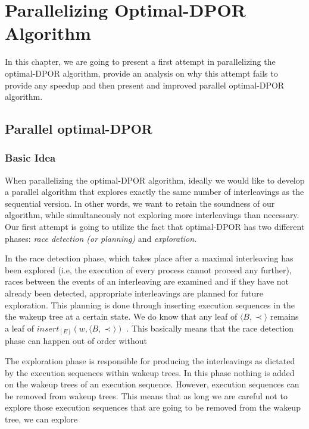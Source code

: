 \chapter{Parallelizing Optimal-DPOR Algorithm}
\label{paradpor_opt}

In this chapter, we are going to present a first attempt in parallelizing the optimal-DPOR
algorithm, provide an analysis on why this attempt fails to provide any speedup and then present 
and improved parallel optimal-DPOR algorithm.

\section{Parallel optimal-DPOR}

\subsection{Basic Idea}

When parallelizing the optimal-DPOR algorithm, ideally we would like to develop a parallel algorithm that explores
exactly the same number of interleavings as the sequential version. In other words, we want to retain
the soundness of our algorithm, while simultaneously not exploring more interleavings than necessary. Our first
attempt is going to utilize the fact that
optimal-DPOR has two different phases: \textit{race detection (or planning)} and \textit{exploration}.

In the race detection phase, which takes place after a maximal interleaving has been explored
(i.e, the execution of every process cannot proceed any further),
races between the events of an interleaving are examined and if
they have not already been detected, appropriate interleavings are planned for future exploration.
This planning is done through inserting execution sequences in the the wakeup tree at a certain state.
We do know that any leaf of $\langle B , \prec \rangle$ remains a leaf of $insert_{[E]}(w,\langle B , \prec \rangle)$
\cite{AbdullaAronisJohnssonSagonasDPOR2014}. This basically means that the race detection phase can happen out of order
without 

The exploration phase is responsible for producing the interleavings as dictated by the execution sequences within wakeup trees. In this phase
nothing is added on the wakeup trees of an execution sequence. However, execution sequences can be removed from wakeup trees. This means
that as long we are careful not to explore those execution sequences that are going to be removed from the wakeup tree, we
can explore 

